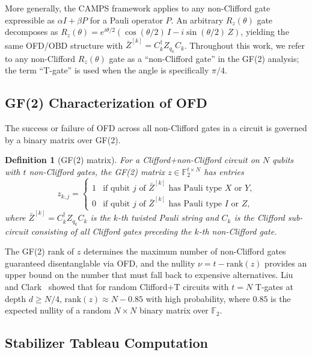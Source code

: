 \documentclass[a4paper,twocolumn,11pt]{quantumarticle}
\newtheorem{definition}[theorem]{Definition}
\begin{document}
More generally, the CAMPS framework applies to any non-Clifford gate expressible as $\alpha I + \beta P$ for a Pauli operator $P$.
An arbitrary $R_z(\theta)$ gate decomposes as $R_z(\theta) = e^{i\theta/2}(\cos(\theta/2)\, I - i\sin(\theta/2)\, Z)$, yielding the same OFD/OBD structure with $\bar{Z}^{[k]} = C_k^\dagger Z_{q_k} C_k$.
Throughout this work, we refer to any non-Clifford $R_z(\theta)$ gate as a ``non-Clifford gate'' in the GF(2) analysis; the term ``T-gate'' is used when the angle is specifically $\pi/4$.

\subsection{GF(2) Characterization of OFD}
\label{sec:gf2_background}

The success or failure of OFD across all non-Clifford gates in a circuit is governed by a binary matrix over GF(2).

\begin{definition}[GF(2) matrix]
\label{def:gf2_matrix}
For a Clifford+non-Clifford circuit on $N$ qubits with $t$ non-Clifford gates, the \emph{GF(2) matrix} $z \in \mathbb{F}_2^{t \times N}$ has entries
\begin{equation}
\label{eq:gf2_entry}
z_{k,j} = \begin{cases} 1 & \text{if qubit $j$ of } \bar{Z}^{[k]} \text{ has Pauli type $X$ or $Y$,} \\ 0 & \text{if qubit $j$ of } \bar{Z}^{[k]} \text{ has Pauli type $I$ or $Z$,} \end{cases}
\end{equation}
where $\bar{Z}^{[k]} = C_k^\dagger Z_{q_k} C_k$ is the $k$-th twisted Pauli string and $C_k$ is the Clifford sub-circuit consisting of all Clifford gates preceding the $k$-th non-Clifford gate.
\end{definition}

The GF(2) rank of $z$ determines the maximum number of non-Clifford gates guaranteed disentanglable via OFD, and the nullity $\nu = t - \mathrm{rank}(z)$ provides an upper bound on the number that must fall back to expensive alternatives.
Liu and Clark~\cite{Liu2024} showed that for random Clifford+T circuits with $t = N$ T-gates at depth $d \ge N/4$, $\mathrm{rank}(z) \approx N - 0.85$ with high probability, where $0.85$ is the expected nullity of a random $N \times N$ binary matrix over $\mathbb{F}_2$.

\subsection{Stabilizer Tableau Computation}
\label{sec:tableau}
\end{document}
